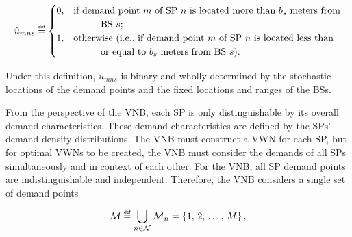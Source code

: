 \documentclass[12pt,dvipsnames]{report}
\newif\ifisdoublespacing
\newcommand\defeq{\mathrel{\overset{\makebox[0pt]{\mbox{\normalfont\tiny\sffamily def}}}{=}}}
\newcommand\tab[1][1cm]{\hspace*{#1}}
\begin{document}
\ifisdoublespacing
\begin{singlespacing}
\begin{equation} \label{eq:umns_simp}
\tilde{u}_{mns} \defeq
	\begin{cases}
		0,& \text{if demand point $m$ of SP $n$ is located more than $b_s$ meters from}\\
		& \text{\tab BS $s$;}\\
		\\
		1,& \text{otherwise (i.e., if demand point $m$ of SP $n$ is located less than}\\
		& \text{\tab or equal to $b_s$ meters from BS $s$).}\\
	\end{cases}
\end{equation}
\end{singlespacing}
\else
\begin{equation} \label{eq:umns_simp}
\tilde{u}_{mns} \defeq
	\begin{cases}
		0,& \text{if demand point $m$ of SP $n$ is located more than $b_s$ meters from}\\
		& \text{\tab BS $s$;}\\
		1,& \text{otherwise (i.e., if demand point $m$ of SP $n$ is located less than}\\
		& \text{\tab or equal to $b_s$ meters from BS $s$).}\\
	\end{cases}
\end{equation}
\fi

\noindent Under this definition, $\tilde{u}_{mns}$ is binary and wholly determined by the stochastic locations of the demand points and the fixed locations and ranges of the BSs.

From the perspective of the VNB, each SP is only distinguishable by its overall demand characteristics.  These demand characteristics are defined by the SPs' demand density distributions.  The VNB must construct a VWN for each SP, but for optimal VWNs to be created, the VNB must consider the demands of all SPs simultaneously and in context of each other.  For the VNB, all SP demand points are indistinguishable and independent.  Therefore, the VNB considers a single set of demand points

\begin{equation} \label{eq:union_M}
\mathcal{M} \defeq \bigcup_{n \in \mathcal{N}} \mathcal{M}_n = \left\{ 1,\, 2,\, \ldots,\, M \right\},
\end{equation}
\end{document}
